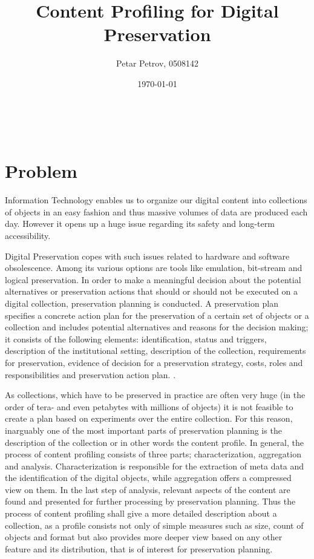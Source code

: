 \documentclass[a4paper,12pt]{scrartcl} %
\title{Content Profiling for Digital Preservation}
\author{Petar Petrov, 0508142}
\date{\today}
\makeatletter
\renewcommand{\maketitle}{\begingroup
    \let\footnotesize\small
    \let\footnoterule\relax
    \parindent \z@
    \reset@font
    \vskip 1\p@
    \begin{flushleft}
      \LARGE
      \strut\@title
    \end{flushleft}
    \@author \\
    \@date
    \vskip 40\p@
  \endgroup
  \setcounter{footnote}{0}%
}
\makeatother
\begin{document}
\maketitle

\section*{Problem}
Information Technology enables us to organize our digital content into collections of objects in an easy fashion and thus massive volumes of data are produced each day. However it opens up a huge issue
regarding its safety and long-term accessibility.

Digital Preservation copes with such issues related to hardware and software obsolescence. Among its various
options are tools like emulation, bit-stream and logical preservation. In order to make a meaningful decision
about the potential alternatives or preservation actions that should or should not be executed on a
digital collection, preservation planning is conducted. A preservation plan specifies a concrete action plan for the preservation
of a certain set of objects or a collection and includes potential alternatives and reasons for the decision making; it
consists of the following elements: identification, status and triggers, description of the institutional setting, description of the collection, requirements for preservation, evidence of decision for a preservation strategy, costs, roles and responsibilities and preservation action plan. \cite{Becker:2009fk}. 

As collections, which have to be preserved in practice are often very huge (in the order of tera- and even petabytes with millions of objects) it is not feasible to create a plan based on experiments over the entire collection. For this reason, inarguably one of the most important parts of preservation planning is the description of the collection or in other words the content profile. In general, the process of content profiling consists of three parts; characterization, aggregation and analysis. Characterization is responsible for the extraction of meta data and the identification of the digital objects, while aggregation offers a compressed view on them. In the last step of analysis, relevant aspects of the content are found and presented for further processing by preservation planning. Thus the process of content profiling shall give a more detailed description about a collection, as a profile consists not only of simple measures such as size, count of objects and format but also provides more deeper view based on any other feature and its distribution, that is of interest for preservation planning. 
\end{document}
